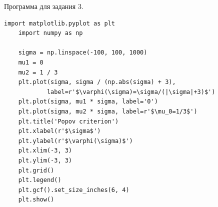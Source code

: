 \documentclass[a4paper, 12pt]{article}
\begin{document}
    Программа для задания 3.
    \begin{lstlisting}[label=task3code, caption={Программа для построения графика $\varphi(\sigma)$}]
    import matplotlib.pyplot as plt
    import numpy as np

    sigma = np.linspace(-100, 100, 1000)
    mu1 = 0
    mu2 = 1 / 3
    plt.plot(sigma, sigma / (np.abs(sigma) + 3),
            label=r'$\varphi(\sigma)=\sigma/(|\sigma|+3)$')
    plt.plot(sigma, mu1 * sigma, label='0')
    plt.plot(sigma, mu2 * sigma, label=r'$\mu_0=1/3$')
    plt.title('Popov criterion')
    plt.xlabel(r'$\sigma$')
    plt.ylabel(r'$\varphi(\sigma)$')
    plt.xlim(-3, 3)
    plt.ylim(-3, 3)
    plt.grid()
    plt.legend()
    plt.gcf().set_size_inches(6, 4)
    plt.show()
    \end{lstlisting}
\end{document}

